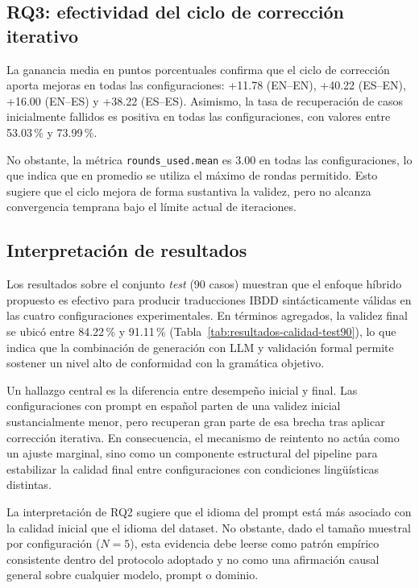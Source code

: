 \subsection{RQ3: efectividad del ciclo de corrección iterativo}

La ganancia media en puntos porcentuales confirma que el ciclo de corrección aporta mejoras en todas las configuraciones: +11.78 (EN--EN), +40.22 (ES--EN), +16.00 (EN--ES) y +38.22 (ES--ES). Asimismo, la tasa de recuperación de casos inicialmente fallidos es positiva en todas las configuraciones, con valores entre 53.03\,\% y 73.99\,\%.

No obstante, la métrica \texttt{rounds\_used.mean} es 3.00 en todas las configuraciones, lo que indica que en promedio se utiliza el máximo de rondas permitido. Esto sugiere que el ciclo mejora de forma sustantiva la validez, pero no alcanza convergencia temprana bajo el límite actual de iteraciones.

\subsection{Interpretación de resultados}

Los resultados sobre el conjunto \textit{test} (90 casos) muestran que el enfoque híbrido propuesto es efectivo para producir traducciones IBDD sintácticamente válidas en las cuatro configuraciones experimentales. En términos agregados, la validez final se ubicó entre 84.22\,\% y 91.11\,\% (Tabla~\ref{tab:resultados-calidad-test90}), lo que indica que la combinación de generación con LLM y validación formal permite sostener un nivel alto de conformidad con la gramática objetivo.

Un hallazgo central es la diferencia entre desempeño inicial y final. Las configuraciones con prompt en español parten de una validez inicial sustancialmente menor, pero recuperan gran parte de esa brecha tras aplicar corrección iterativa. En consecuencia, el mecanismo de reintento no actúa como un ajuste marginal, sino como un componente estructural del pipeline para estabilizar la calidad final entre configuraciones con condiciones lingüísticas distintas.

La interpretación de RQ2 sugiere que el idioma del prompt está más asociado con la calidad inicial que el idioma del dataset. No obstante, dado el tamaño muestral por configuración ($N=5$), esta evidencia debe leerse como patrón empírico consistente dentro del protocolo adoptado y no como una afirmación causal general sobre cualquier modelo, prompt o dominio.

